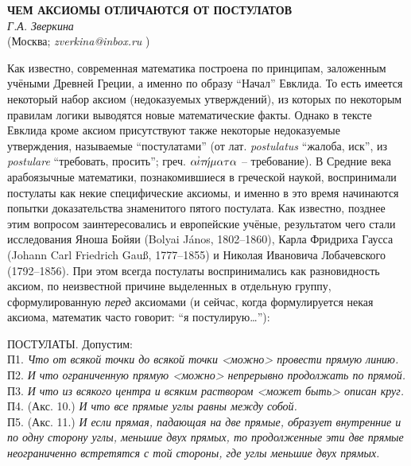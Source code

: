\begin{center}{ \bf  ЧЕМ АКСИОМЫ ОТЛИЧАЮТСЯ ОТ ПОСТУЛАТОВ}\\
{\it Г.А. Зверкина } \\
(Москва; {\it zverkina@inbox.ru} )
\end{center}


Как известно, современная математика построена по принципам, заложенным учёными Древней Греции, а именно по образу ``Начал'' Евклида.
То есть имеется некоторый набор аксиом (недоказуемых утверждений), из которых по некоторым правилам логики выводятся новые математические факты.
Однако в тексте Евклида кроме аксиом присутствуют также некоторые недоказуемые утверждения, называемые ``пос\-ту\-ла\-та\-ми'' (от лат. {\it pos\-tu\-la\-tus} ``жа\-ло\-ба, иск'',  из {\it po\-s\-tu\-la\-re} ``требовать, просить''; греч. $\alpha\!\!\stackrel{,}{\iota}\!\!\tau\mbox{\'{$\!\!\!\!\eta$}}\mu\alpha\tau\alpha$ -- требование).
В Средние века арабоязычные математики, познакомившиеся в греческой наукой, воспринимали постулаты как некие специфические аксиомы, и именно в это время начинаются попытки доказательства знаменитого пятого постулата.
Как известно, позднее этим вопросом заинтересовались и европейские учёные, результатом чего стали исследования Яно\-ша Бойяи (Bolyai J\'anos, 1802--1860), Карла Фридриха Гаус\-са (Johann Carl Friedrich Gau\ss, 1777--1855) и Николая Ивановича Лобачевского (1792--1856).
При этом всегда постулаты воспринимались как разновидность аксиом, по неизвестной причине выделенных в отдельную группу, сформулированную {\it перед} аксиомами (и сейчас, когда формулируется некая аксиома, математик часто говорит: ``я постулирую\ldots''):

ПОСТУЛАТЫ. Допустим:
\\
П1. {\it Что от всякой точки до всякой точки <можно> провести прямую линию.}
\\
П2. {\it И что ограниченную прямую <можно> непрерывно продолжать по прямой.}
\\
П3. {\it И что из всякого центра и всяким раствором <может быть> описан круг.}
\\
П4. (Акс. 10.) {\it  И что все прямые углы равны между собой.}
\\
П5. (Акс. 11.) {\it  И если прямая, падающая на две прямые, образует внутренние и по одну сторону углы, меньшие двух прямых, то продолженные эти две прямые неограниченно встретятся с той стороны, где углы
меньшие двух прямых.}

